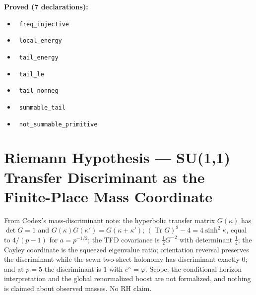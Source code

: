 \documentclass{report}
\theoremstyle{definition}
\begin{document}
\noindent\textbf{Proved (7 declarations):}
\begin{itemize}
  \item {}\leanok\ \texttt{freq\_injective}
  \item {}\leanok\ \texttt{local\_energy}
  \item {}\leanok\ \texttt{tail\_energy}
  \item {}\leanok\ \texttt{tail\_le}
  \item {}\leanok\ \texttt{tail\_nonneg}
  \item {}\leanok\ \texttt{summable\_tail}
  \item {}\leanok\ \texttt{not\_summable\_primitive}
\end{itemize}

\section{Riemann Hypothesis --- SU(1,1) Transfer Discriminant as the Finite-Place Mass Coordinate}
From Codex's mass-discriminant note: the hyperbolic transfer matrix $G(\kappa)$ has $\det G=1$ and $G(\kappa)G(\kappa')=G(\kappa+\kappa')$; $(\operatorname{Tr}G)^2-4=4\sinh^2\kappa$, equal to $4/(p-1)$ for $a=p^{-1/2}$; the TFD covariance is $\tfrac12G^{-2}$ with determinant $\tfrac14$; the Cayley coordinate is the squeezed eigenvalue ratio; orientation reversal preserves the discriminant while the sewn two-sheet holonomy has discriminant exactly $0$; and at $p=5$ the discriminant is $1$ with $e^\kappa=\varphi$. Scope: the conditional horizon interpretation and the global renormalized boost are not formalized, and nothing is claimed about observed masses. No RH claim.
\end{document}
